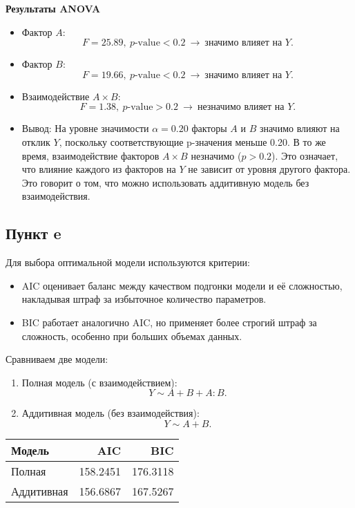 \documentclass[12pt]{spbstu-task}
\begin{document}
\textbf{Результаты ANOVA}
\begin{itemize}
\item Фактор \(A\): \[F = 25.89,\ p\text{-value} < 0.2 \ \rightarrow \
  \text{значимо влияет на } Y.\]
\item Фактор \(B\): \[F = 19.66,\ p\text{-value} < 0.2 \ \rightarrow \
  \text{значимо влияет на } Y.\]
\item Взаимодействие \(A \times B\): \[F = 1.38,\ p\text{-value} > 0.2 \
  \rightarrow \ \text{незначимо влияет на } Y.\]
\item Вывод: На уровне значимости \(\alpha = 0.20\) факторы \(A\) и \(B\)
значимо влияют на отклик \(Y\), поскольку соответствующие p-значения
меньше 0.20.  В то же время, взаимодействие факторов \(A \times B\)
незначимо (\(p > 0.2\)).  Это означает, что влияние каждого из
факторов на \(Y\) не зависит от уровня другого фактора.  Это говорит
о том, что можно использовать аддитивную модель без взаимодействия.
\end{itemize}
\subsection{Пункт e}
\label{sec:org9e4ae44}
Для выбора оптимальной модели используются критерии:
\begin{itemize}
\item AIC оценивает баланс между качеством подгонки модели и её
сложностью, накладывая штраф за избыточное количество параметров.
\item BIC работает аналогично AIC, но применяет более строгий штраф за
сложность, особенно при больших объемах данных.
\end{itemize}

Сравниваем две модели:
\begin{enumerate}
\item Полная модель (с взаимодействием): \[Y \sim A + B + A : B.\]
\item Аддитивная модель (без взаимодействия): \[Y \sim A + B.\]
\end{enumerate}

\begin{table}[H]
  \centering
  \begin{tabular}{lrr} \toprule
    Модель & AIC & BIC \\ \midrule
    Полная & 158.2451 & 176.3118 \\
    Аддитивная & 156.6867 & 167.5267 \\ \bottomrule
  \end{tabular}
\end{table}
\end{document}
